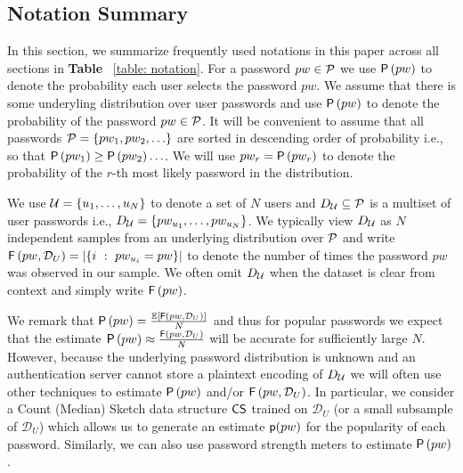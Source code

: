 

\subsection{Notation Summary}
In this section, we summarize frequently used notations in this paper across all sections in \textbf{Table} ~\ref{table: notation}.  For a password $pw \in \mathcal{P}$ we use $\mathsf{P}\left(pw\right)$ to denote the probability each user selects the password $pw$. We assume that there is some underyling distribution over user passwords and use $\mathsf{P}\left(pw\right)$ to denote the probability of the password $pw \in \mathcal{P}$. It will be convenient to assume that all passwords $ \mathcal{P} = \{pw_1,pw_2,\ldots \}$ are sorted in descending order of probability i.e., so that $\mathsf{P}\left(pw_1\right) \geq \mathsf{P}\left(pw_2\right) \ldots $. We will use $pw_r = \mathsf{P}\left(pw_r\right)$ to denote the probability of the $r$-th most likely password in the distribution. 

We use  $\mathcal{U} = \{u_1,\ldots,u_N\}$ to denote a set of  $N$ users and $D_\mathcal{\mathcal{U}} \subseteq \mathcal{P}$ is a multiset of user passwords i.e., $D_\mathcal{\mathcal{U}} = \{pw_{u_1},\ldots,pw_{u_N}\}$. We typically view $D_\mathcal{\mathcal{U}}$ as $N$ independent samples from an underlying distribution over $\mathcal{P}$ and write $\mathsf{F}\left(pw, \mathcal{D}_U\right) = \left| \left\{ i ~:~pw_{u_i} = pw \right\} \right|$ to denote the number of times the password $pw$ was observed in our sample. We often omit $D_\mathcal{\mathcal{U}}$ when the dataset is clear from context and simply write $\mathsf{F}\left(pw\right)$. 

We remark that $\mathsf{P}\left(pw\right) = \frac{\mathbb{E}\left[ \mathsf{F}\left(pw,  \mathcal{D}_U\right)\right]}{N}$ and thus for popular passwords we expect that the estimate $\mathsf{P}\left(pw\right) \approx  \frac{\mathsf{F}\left(pw, \mathcal{D}_U\right)}{N}$ will be accurate for sufficiently large $N$. However, because the underlying password distribution is unknown and an authentication server cannot store a plaintext encoding of $D_\mathcal{\mathcal{U}}$ we will often use other techniques to estimate  $\mathsf{P}\left(pw\right)$ and/or $\mathsf{F}\left(pw, \mathcal{D}_U\right)$. In particular, we consider a Count (Median) Sketch data structure $\mathsf{CS}$ trained on $\mathcal{D}_U$ (or a small subsample of $\mathcal{D}_U$) which allows us to generate an estimate $\textsf{p}(pw)$ for the popularity of each password. Similarly, we can also use password strength meters to estimate $\mathsf{P}\left(pw\right)$.


